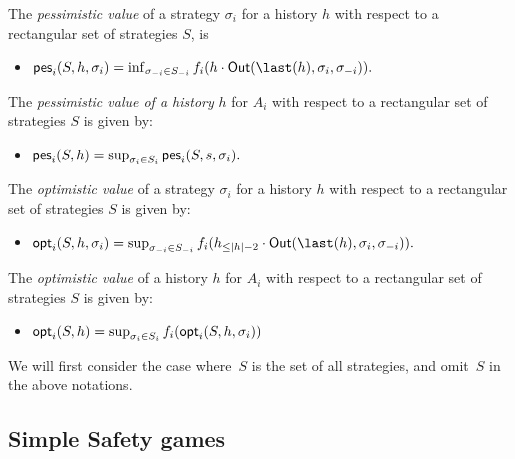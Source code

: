 \begin{definition}[Values] The \emph{pessimistic value} of a strategy
\(\sigma_i\) for a history \(h\) with respect to a rectangular set of
strategies \(S\), is

\begin{itemize}
\item
  \(\pes_i(S,h,\sigma_i) = \inf_{\sigma_{-i} \in S_{-i}} \payoff_{i}(h \cdot \Out(\last(h), \sigma_i,\sigma_{-i})).\)
\end{itemize}

The \emph{pessimistic value of a history} \(h\) for \(A_i\) with respect
to a rectangular set of strategies \(S\) is given by:

\begin{itemize}

\item
  \(\textsf{pes}_i(S,h) = \sup_{\sigma_i \in S_i} \textsf{pes}_i(S,s,\sigma_i).\)
\end{itemize}

The \emph{optimistic value} of a strategy \(\sigma_i\) for a history
\(h\) with respect to a rectangular set of strategies \(S\) is given by:

\begin{itemize}

\item
  \(\opt_i(S,h,\sigma_i) = \sup_{\sigma_{-i} \in S_{-i}} \payoff_i (h_{\le |h|-2} \cdot \Out(\last(h), \sigma_i,\sigma_{-i})).\)
\end{itemize}

The \emph{optimistic value} of a history \(h\) for \(A_{i}\) with
respect to a rectangular set of strategies \(S\) is given by:

\begin{itemize}

\item
  \(\textsf{opt}_i(S,h) = \sup_{\sigma_i \in S_i} f_{i}(\textsf{opt}_i(S,h,\sigma_i))\)
\end{itemize}
\end{definition}

We will first consider the case where~$S$ is the set of all strategies,
and omit~$S$ in the above notations.

\subsection{Simple Safety games}\label{simple-safety-games}


